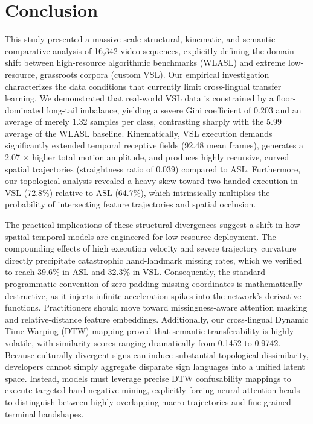 \documentclass{ieeeaccess}
\begin{document}
\section{Conclusion} \label{sec:conclusion}

This study presented a massive-scale structural, kinematic, and semantic comparative analysis of 16,342 video sequences, explicitly defining the domain shift between high-resource algorithmic benchmarks (WLASL) and extreme low-resource, grassroots corpora (custom VSL). Our empirical investigation characterizes the data conditions that currently limit cross-lingual transfer learning. We demonstrated that real-world VSL data is constrained by a floor-dominated long-tail imbalance, yielding a severe Gini coefficient of 0.203 and an average of merely 1.32 samples per class, contrasting sharply with the 5.99 average of the WLASL baseline. Kinematically, VSL execution demands significantly extended temporal receptive fields (92.48 mean frames), generates a 2.07 $\times$ higher total motion amplitude, and produces highly recursive, curved spatial trajectories (straightness ratio of 0.039) compared to ASL. Furthermore, our topological analysis revealed a heavy skew toward two-handed execution in VSL (72.8\%) relative to ASL (64.7\%), which intrinsically multiplies the probability of intersecting feature trajectories and spatial occlusion. 

The practical implications of these structural divergences suggest a shift in how spatial-temporal models are engineered for low-resource deployment. The compounding effects of high execution velocity and severe trajectory curvature directly precipitate catastrophic hand-landmark missing rates, which we verified to reach 39.6\% in ASL and 32.3\% in VSL. Consequently, the standard programmatic convention of zero-padding missing coordinates is mathematically destructive, as it injects infinite acceleration spikes into the network's derivative functions. Practitioners should move toward missingness-aware attention masking and relative-distance feature embeddings. Additionally, our cross-lingual Dynamic Time Warping (DTW) mapping proved that semantic transferability is highly volatile, with similarity scores ranging dramatically from 0.1452 to 0.9742. Because culturally divergent signs can induce substantial topological dissimilarity, developers cannot simply aggregate disparate sign languages into a unified latent space. Instead, models must leverage precise DTW confusability mappings to execute targeted hard-negative mining, explicitly forcing neural attention heads to distinguish between highly overlapping macro-trajectories and fine-grained terminal handshapes.
\end{document}
